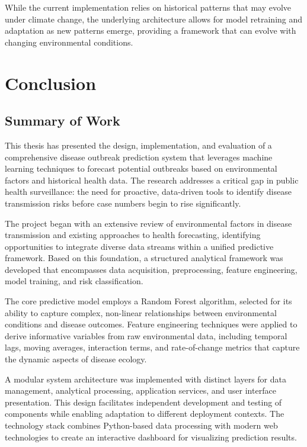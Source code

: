 \documentclass[12pt,a4paper]{report}
\begin{document}
While the current implementation relies on historical patterns that may evolve under climate change, the underlying architecture allows for model retraining and adaptation as new patterns emerge, providing a framework that can evolve with changing environmental conditions.

\chapter{Conclusion}
\section{Summary of Work}
This thesis has presented the design, implementation, and evaluation of a comprehensive disease outbreak prediction system that leverages machine learning techniques to forecast potential outbreaks based on environmental factors and historical health data. The research addresses a critical gap in public health surveillance: the need for proactive, data-driven tools to identify disease transmission risks before case numbers begin to rise significantly.

The project began with an extensive review of environmental factors in disease transmission and existing approaches to health forecasting, identifying opportunities to integrate diverse data streams within a unified predictive framework. Based on this foundation, a structured analytical framework was developed that encompasses data acquisition, preprocessing, feature engineering, model training, and risk classification.

The core predictive model employs a Random Forest algorithm, selected for its ability to capture complex, non-linear relationships between environmental conditions and disease outcomes. Feature engineering techniques were applied to derive informative variables from raw environmental data, including temporal lags, moving averages, interaction terms, and rate-of-change metrics that capture the dynamic aspects of disease ecology.

A modular system architecture was implemented with distinct layers for data management, analytical processing, application services, and user interface presentation. This design facilitates independent development and testing of components while enabling adaptation to different deployment contexts. The technology stack combines Python-based data processing with modern web technologies to create an interactive dashboard for visualizing prediction results.
\end{document}
